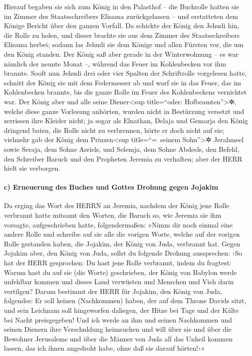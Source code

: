 Hierauf begaben sie sich zum König in den Palasthof --
die Buchrolle hatten sie im Zimmer des Staatsschreibers Elisama
zurückgelassen -- und erstatteten dem Könige Bericht über den ganzen
Vorfall. Da schickte der König den Jehudi hin, die Rolle
zu holen, und dieser brachte sie aus dem Zimmer des Staatsschreibers
Elisama herbei; sodann las Jehudi sie dem Könige und allen Fürsten vor,
die um den König standen. Der König saß aber gerade in
der Winterwohnung -- es war nämlich der neunte Monat --, während das
Feuer im Kohlenbecken vor ihm brannte. Sooft nun Jehudi
drei oder vier Spalten der Schriftrolle vorgelesen hatte, schnitt der
König sie mit dem Federmesser ab und warf sie in das Feuer, das im
Kohlenbecken brannte, bis die ganze Rolle im Feuer des Kohlenbeckens
vernichtet war. Der König aber und alle seine
Diener\textless sup title=``oder: Hofbeamten''\textgreater✲, welche
diese ganze Vorlesung anhörten, wurden nicht in Bestürzung versetzt und
zerrissen ihre Kleider nicht; ja sogar als Elnathan,
Delaja und Gemarja den König dringend baten, die Rolle nicht zu
verbrennen, hörte er doch nicht auf sie; vielmehr gab der
König dem Prinzen\textless sup title=``=~seinem Sohn''\textgreater✲
Jerahmeel sowie Seraja, dem Sohne Asriels, und Selemja, dem Sohne
Abdeels, den Befehl, den Schreiber Baruch und den Propheten Jeremia zu
verhaften; aber der HERR hielt sie verborgen.

\hypertarget{c-erneuerung-des-buches-und-gottes-drohung-gegen-jojakim}{%
\paragraph{c) Erneuerung des Buches und Gottes Drohung gegen
Jojakim}\label{c-erneuerung-des-buches-und-gottes-drohung-gegen-jojakim}}

Da erging das Wort des HERRN an Jeremia, nachdem der
König jene Rolle verbrannt hatte mitsamt den Worten, die Baruch so, wie
Jeremia sie ihm vorsagte, aufgeschrieben hatte, folgendermaßen:
»Nimm dir noch einmal eine andere Rolle und schreibe auf
sie alle die vorigen Worte, welche auf der vorigen Rolle gestanden
haben, die Jojakim, der König von Juda, verbrannt hat.
Gegen Jojakim aber, den König von Juda, sollst du
folgende Drohung aussprechen: ›So hat der HERR gesprochen: Du hast jene
Rolle verbrannt, indem du fragtest: Warum hast du auf sie (die Worte)
geschrieben, der König von Babylon werde unfehlbar kommen und dieses
Land verwüsten und Menschen und Vieh darin vertilgen?
Darum bestimmt der HERR für Jojakim, den König von Juda,
folgendes: Er soll keinen (Nachkommen) haben, der auf dem Throne Davids
sitzt, und sein Leichnam soll hingeworfen daliegen, der Hitze bei Tage
und der Kälte bei Nacht preisgegeben! Und ich werde an
ihm und seinen Nachkommen und seinen Dienern ihre Verschuldung
heimsuchen und will über sie und über die Bewohner Jerusalems und über
die Männer von Juda all das Unheil kommen lassen, das ich ihnen
angedroht habe, ohne daß sie darauf hörten!‹«

